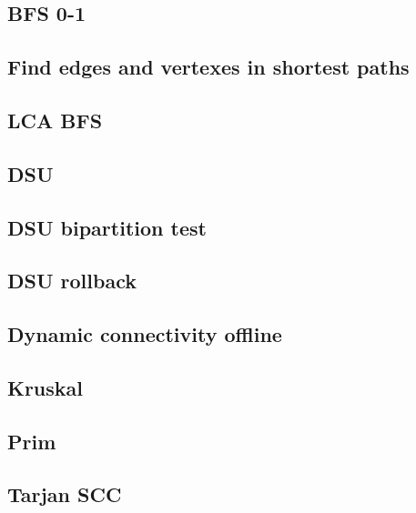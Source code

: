 \subsection{BFS 0-1}
\raggedbottom
\hrulefill
\subsection{Find edges and vertexes in shortest paths}
\raggedbottom
\hrulefill
\subsection{LCA BFS}
\raggedbottom
\hrulefill
\subsection{DSU}
\raggedbottom
\hrulefill
\subsection{DSU bipartition test}
\raggedbottom
\hrulefill
\subsection{DSU rollback}
\raggedbottom
\hrulefill
\subsection{Dynamic connectivity offline}
\raggedbottom
\hrulefill
\subsection{Kruskal}
\raggedbottom
\hrulefill
\subsection{Prim}
\raggedbottom
\hrulefill
\subsection{Tarjan SCC}
\raggedbottom
\hrulefill
